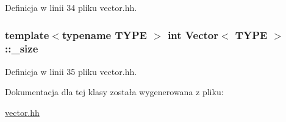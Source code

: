 Definicja w linii 34 pliku vector.\-hh.

\hypertarget{class_vector_a327a1cd9125262e7023b39ff6bc2a6c0}{
\subsubsection[{\-\_\-size}]{\setlength{\rightskip}{0pt plus 5cm}template$<$typename T\-Y\-P\-E $>$ int {\bf Vector}$<$ T\-Y\-P\-E $>$\-::\-\_\-size\hspace{0.3cm}{\ttfamily [private]}}}\label{class_vector_a327a1cd9125262e7023b39ff6bc2a6c0}


Definicja w linii 35 pliku vector.\-hh.



Dokumentacja dla tej klasy została wygenerowana z pliku\-:\begin{DoxyCompactItemize}
\item 
\hyperlink{vector_8hh}{vector.\-hh}\end{DoxyCompactItemize}

